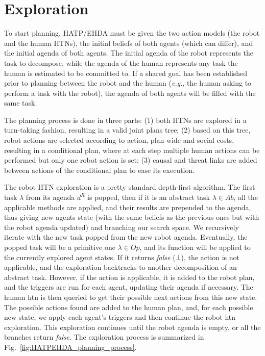 \section{Exploration}

To start planning, HATP/EHDA must be given the two action models (the robot and the human HTNs), the initial beliefs of both agents (which can differ), and the initial agenda of both agents. The initial agenda of the robot represents the task to decompose, while the agenda of the human represents any task the human is estimated to be committed to. If a shared goal has been established prior to planning between the robot and the human (\textit{e.g.}, the human asking to perform a task with the robot), the agenda of both agents will be filled with the same task.

The planning process is done in three parts: (1) both HTNs are explored in a turn-taking fashion, resulting in a valid joint plans tree; (2) based on this tree, robot actions are selected according to action, plan-wide and social costs, resulting in a conditional plan, where at each step multiple human actions can be performed but only one robot action is set; (3) causal and threat links are added between actions of the conditional plan to ease its execution.

The robot HTN exploration is a pretty standard depth-first algorithm. The first task $\lambda$ from its agenda $d^R$ is popped, then if it is an abstract task $\lambda \in Ab$, all the applicable methods are applied, and their results are prepended to the agenda, thus giving new agents state (with the same beliefs as the previous ones but with the robot agenda updated) and branching our search space. We recursively iterate with the new task popped from the new robot agenda. Eventually, the popped task will be a primitive one $\lambda \in Op$, and its function will be applied to the currently explored agent states. If it returns \textit{false} ($\bot$), the action is not applicable, and the exploration backtracks to another decomposition of an abstract task. However, if the action is applicable, it is added to the robot plan, and the triggers are run for each agent, updating their agenda if necessary. The human \acrshort{htn} is then queried to get their possible next actions from this new state. The possible actions found are added to the human plan, and, for each possible new state, we apply each agent's triggers and then continue the robot \acrshort{htn} exploration. This exploration continues until the robot agenda is empty, or all the branches return \textit{false}. The exploration process is summarized in Fig.~\ref{fig:HATPEHDA_planning_process}.

